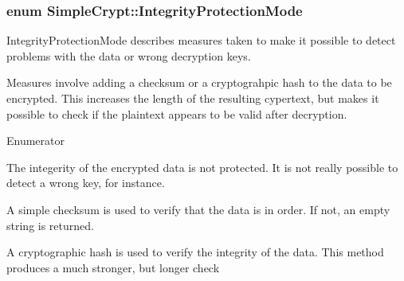 \subsubsection[{Integrity\+Protection\+Mode}]{\setlength{\rightskip}{0pt plus 5cm}enum {\bf Simple\+Crypt\+::\+Integrity\+Protection\+Mode}}\label{class_simple_crypt_a42a5172e558d346b28421cc4e85feb2d}
Integrity\+Protection\+Mode describes measures taken to make it possible to detect problems with the data or wrong decryption keys.

Measures involve adding a checksum or a cryptograhpic hash to the data to be encrypted. This increases the length of the resulting cypertext, but makes it possible to check if the plaintext appears to be valid after decryption. \begin{Desc}
\item[Enumerator]\par
\begin{description}
\item[{\em 
\hypertarget{class_simple_crypt_a42a5172e558d346b28421cc4e85feb2da75547c41ccde1fb3d4db9f8c27164e4c}{}Protection\+None\label{class_simple_crypt_a42a5172e558d346b28421cc4e85feb2da75547c41ccde1fb3d4db9f8c27164e4c}
}]The integerity of the encrypted data is not protected. It is not really possible to detect a wrong key, for instance. \item[{\em 
\hypertarget{class_simple_crypt_a42a5172e558d346b28421cc4e85feb2dab6ccee9e9680f70c79213647c7814e5c}{}Protection\+Checksum\label{class_simple_crypt_a42a5172e558d346b28421cc4e85feb2dab6ccee9e9680f70c79213647c7814e5c}
}]A simple checksum is used to verify that the data is in order. If not, an empty string is returned. \item[{\em 
\hypertarget{class_simple_crypt_a42a5172e558d346b28421cc4e85feb2daf915c42837795744edbc5254eb93154f}{}Protection\+Hash\label{class_simple_crypt_a42a5172e558d346b28421cc4e85feb2daf915c42837795744edbc5254eb93154f}
}]A cryptographic hash is used to verify the integrity of the data. This method produces a much stronger, but longer check \end{description}
\end{Desc}


